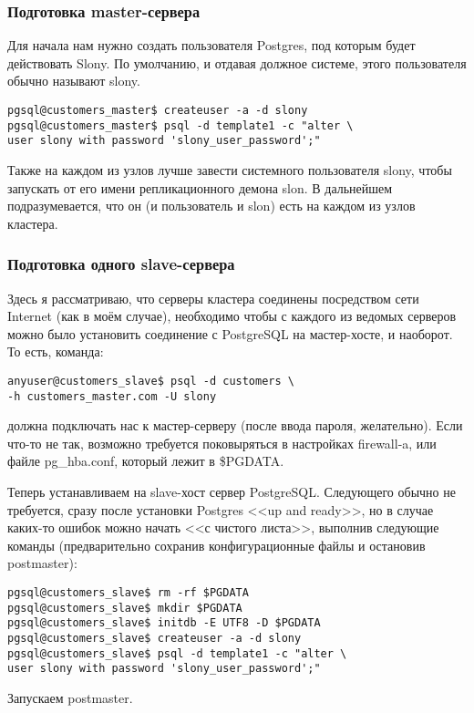 \subsubsection{Подготовка master-сервера}
Для начала нам нужно создать пользователя Postgres, под которым будет действовать Slony. 
По умолчанию, и отдавая должное системе, этого пользователя обычно называют slony.
\begin{verbatim}
pgsql@customers_master$ createuser -a -d slony
pgsql@customers_master$ psql -d template1 -c "alter \
user slony with password 'slony_user_password';"
\end{verbatim}

Также на каждом из узлов лучше завести системного пользователя slony, чтобы запускать от его имени 
репликационного демона slon. В дальнейшем подразумевается, что он (и пользователь и slon) есть на 
каждом из узлов кластера. 

\subsubsection{Подготовка одного slave-сервера}
Здесь я рассматриваю, что серверы кластера соединены посредством сети Internet (как в моём случае), необходимо 
чтобы с каждого из ведомых серверов можно было установить соединение с PostgreSQL на мастер-хосте, и наоборот. 
То есть, команда:
\begin{verbatim}
anyuser@customers_slave$ psql -d customers \
-h customers_master.com -U slony
\end{verbatim}

должна подключать нас к мастер-серверу (после ввода пароля, желательно). Если что-то не так, возможно требуется 
поковыряться в настройках firewall-a, или файле pg\_hba.conf, который лежит в \$PGDATA.

Теперь устанавливаем на slave-хост сервер PostgreSQL. Следующего обычно не требуется, сразу после установки Postgres 
<<up and ready>>, но в случае каких-то ошибок можно начать <<с чистого листа>>, выполнив следующие команды 
(предварительно сохранив конфигурационные файлы и остановив postmaster):
\begin{verbatim}
pgsql@customers_slave$ rm -rf $PGDATA
pgsql@customers_slave$ mkdir $PGDATA
pgsql@customers_slave$ initdb -E UTF8 -D $PGDATA
pgsql@customers_slave$ createuser -a -d slony
pgsql@customers_slave$ psql -d template1 -c "alter \
user slony with password 'slony_user_password';"
\end{verbatim}

Запускаем postmaster.

